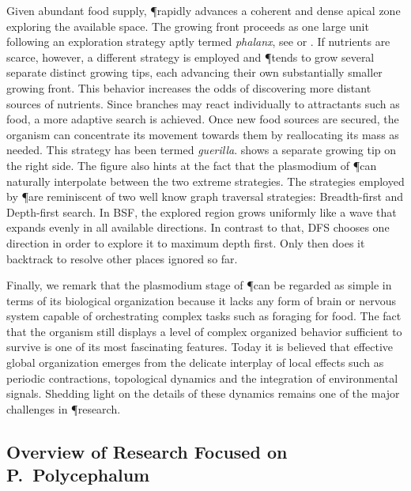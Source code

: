 		Given abundant food supply, \P rapidly advances a coherent and dense apical zone exploring the available space. The growing front proceeds as one large unit following an exploration strategy aptly termed \emph{phalanx}, see  or . If nutrients are scarce, however, a different strategy is employed and \P tends to grow several separate distinct growing tips, each advancing their own substantially smaller growing front. This behavior increases the odds of discovering more distant sources of nutrients. Since branches may react individually to attractants such as food, a more adaptive search is achieved. Once new food sources are secured, the organism can concentrate its movement towards them by reallocating its mass as needed. This strategy has been termed \emph{guerilla}.  shows a separate growing tip on the right side. The figure also hints at the fact that the plasmodium of \P can naturally interpolate between the two extreme strategies. The strategies employed by \P are reminiscent of two well know graph traversal strategies: Breadth-first and Depth-first search. In BSF, the explored region grows uniformly like a wave that expands evenly in all available directions. In contrast to that, DFS chooses one direction in order to explore it to maximum depth first. Only then does it backtrack to resolve other places ignored so far.

		Finally, we remark that the plasmodium stage of \P can be regarded as simple in terms of its biological organization because it lacks any form of brain or nervous system capable of orchestrating complex tasks such as foraging for food. The fact that the organism still displays a level of complex organized behavior sufficient to survive is one of its most fascinating features. Today it is believed that effective global organization emerges from the delicate interplay of local effects such as periodic contractions, topological dynamics and the integration of environmental signals. Shedding light on the details of these dynamics remains one of the major challenges in \P research.

		\FloatBarrier

	\subsection{Overview of Research Focused on P.~Polycephalum}

